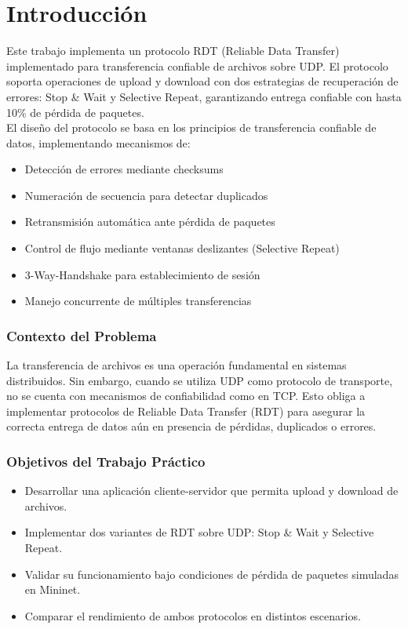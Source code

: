 \section{Introducción}
Este trabajo implementa un protocolo RDT (Reliable Data Transfer) implementado para transferencia confiable de archivos sobre UDP. El protocolo soporta operaciones de upload y download con dos estrategias de recuperación de errores: Stop \& Wait y Selective Repeat, garantizando entrega confiable con hasta 10\% de pérdida de paquetes.
\\

El diseño del protocolo se basa en los principios de transferencia confiable de datos, implementando mecanismos de:
\begin{itemize}
    \item Detección de errores mediante checksums
    \item Numeración de secuencia para detectar duplicados
    \item Retransmisión automática ante pérdida de paquetes
    \item Control de flujo mediante ventanas deslizantes (Selective Repeat)
    \item 3-Way-Handshake para establecimiento de sesión
    \item Manejo concurrente de múltiples transferencias
\end{itemize}

\subsubsection*{Contexto del Problema}
La transferencia de archivos es una operación fundamental en sistemas distribuidos. Sin embargo, cuando se utiliza UDP como protocolo de transporte, no se cuenta con mecanismos de confiabilidad como en TCP. Esto obliga a implementar protocolos de Reliable Data Transfer (RDT) para asegurar la correcta entrega de datos aún en presencia de pérdidas, duplicados o errores.

\subsubsection*{Objetivos del Trabajo Práctico}
\begin{itemize}
\item Desarrollar una aplicación cliente-servidor que permita upload y download de archivos.

\item Implementar dos variantes de RDT sobre UDP: Stop \& Wait y Selective Repeat.

\item Validar su funcionamiento bajo condiciones de pérdida de paquetes simuladas en Mininet.

\item Comparar el rendimiento de ambos protocolos en distintos escenarios.
\end{itemize}

